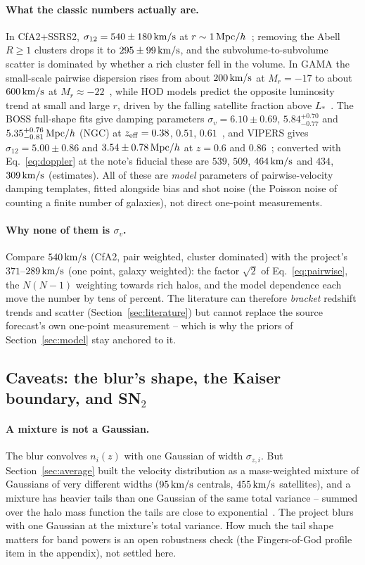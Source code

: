 \documentclass[11pt]{article}
\newcommand{\sv}{\sigma_v}
\newcommand{\kms}{\,{\rm km/s}}
\newcommand{\Mpch}{\,{\rm Mpc}/h}
\begin{document}
\paragraph{What the classic numbers actually are.}
In CfA2+SSRS2, $\sigma_{12} = 540 \pm 180\kms$ at
$r \sim 1\Mpch$~\cite{Marzke1995}; removing the Abell $R \ge 1$
clusters drops it to $295 \pm 99\kms$, and the subvolume-to-subvolume
scatter is dominated by whether a rich cluster fell in the volume.
In GAMA the small-scale pairwise dispersion rises from about
$200\kms$ at $M_r = -17$ to about $600\kms$ at
$M_r \approx -22$~\cite{Loveday2018}, while HOD models predict the
opposite luminosity trend at small and large $r$, driven by the
falling satellite fraction above $L_*$~\cite{Tinker2007}.  The BOSS
full-shape fits give damping parameters
$\sigma_v = 6.10 \pm 0.69$, $5.84^{+0.70}_{-0.77}$ and
$5.35^{+0.76}_{-0.81}\Mpch$ (NGC) at $z_{\rm eff} = 0.38$, $0.51$,
$0.61$~\cite{Beutler2017}, and VIPERS gives
$\sigma_{12} = 5.00 \pm 0.86$ and $3.54 \pm 0.78\Mpch$ at
$z = 0.6$ and $0.86$~\cite{Pezzotta2017}; converted with
Eq.~\eqref{eq:doppler} at the note's fiducial these are $539$, $509$,
$464\kms$ and $434$, $309\kms$ (estimates).  All of these are
\emph{model} parameters of pairwise-velocity damping templates, fitted
alongside bias and shot noise (the Poisson noise of counting a finite
number of galaxies), not direct one-point measurements.

\paragraph{Why none of them is $\sv$.}
Compare $540\kms$ (CfA2, pair weighted, cluster dominated) with the
project's $371$--$289\kms$ (one point, galaxy weighted): the factor
$\sqrt{2}$ of Eq.~\eqref{eq:pairwise}, the $N(N-1)$ weighting towards
rich halos, and the model dependence each move the number by tens of
percent.  The literature can therefore \emph{bracket} redshift trends
and scatter (Section~\ref{sec:literature}) but cannot replace the
source forecast's own one-point measurement -- which is why the priors
of Section~\ref{sec:model} stay anchored to it.

\subsection{Caveats: the blur's shape, the Kaiser boundary, and
SN$_2$}
\label{sec:caveats}

\paragraph{A mixture is not a Gaussian.}
The blur convolves $n_i(z)$ with one Gaussian of width
$\sigma_{z,i}$.  But Section~\ref{sec:average} built the velocity
distribution as a mass-weighted mixture of Gaussians of very
different widths ($95\kms$ centrals, $455\kms$ satellites), and a
mixture has heavier tails than one Gaussian of the same total
variance -- summed over the halo mass function the tails are close to
exponential~\cite{ShethDiaferio2001}.  The project blurs with one
Gaussian at the mixture's total variance.  How much the tail shape
matters for band powers is an open robustness check (the
Fingers-of-God profile item in the appendix), not settled here.
\end{document}
